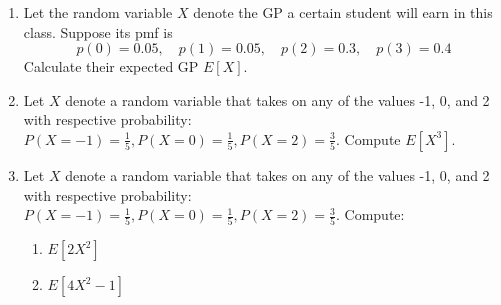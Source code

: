 \documentclass[11pt]{article}
\begin{document}
\begin{enumerate}
\item Let the random variable $X$ denote the GP a certain student will earn in this class. Suppose its pmf is
\[ p(0) = 0.05, \quad p(1) = 0.05, \quad p(2) = 0.3, \quad p(3) = 0.4\]
Calculate their expected GP $E[X]$.

\item Let $X$ denote a random variable that takes on any of the values -1, 0, and 2 with respective probability: $P(X = -1) = \frac{1}{5}, P(X = 0) = \frac{1}{5}, P(X = 2) = \frac{3}{5}$. Compute $E[X^3]$.

\item Let $X$ denote a random variable that takes on any of the values -1, 0, and 2 with respective probability: $P(X = -1) = \frac{1}{5}, P(X = 0) = \frac{1}{5}, P(X = 2) = \frac{3}{5}$. Compute: 
\begin{enumerate}
\item $E[2X^2]$
\item $E[4X^2 - 1]$
\end{enumerate}

\end{enumerate}
\end{document}
